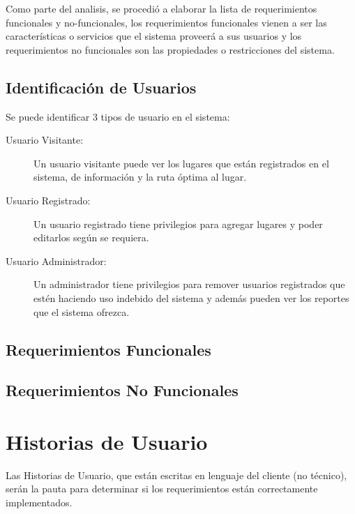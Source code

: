 Como parte del analisis, se procedió a elaborar la lista de requerimientos funcionales y no-funcionales, los requerimientos funcionales vienen a ser las características o servicios que el sistema proveerá a sus usuarios y los requerimientos no funcionales son las propiedades o restricciones del sistema.


\subsection{Identificación de Usuarios}

Se puede identificar 3 tipos de usuario en el sistema:

\begin{description}
\item[Usuario Visitante:] Un usuario visitante puede ver los lugares que están registrados en el sistema, de información y la ruta óptima al lugar.

\item[Usuario Registrado:] Un usuario registrado tiene privilegios para agregar lugares y poder editarlos según se requiera.

\item[Usuario Administrador:] Un administrador tiene privilegios para remover usuarios registrados que estén haciendo uso indebido del sistema y además pueden ver los reportes que el sistema ofrezca.

\end{description}


\subsection{Requerimientos Funcionales}



\subsection{Requerimientos No Funcionales}





  \section{Historias de Usuario}
  \label{sec:historias_de_usuario}

    Las Historias de Usuario, que están escritas en lenguaje del cliente (no técnico), serán la pauta para  determinar si los requerimientos están correctamente implementados.

